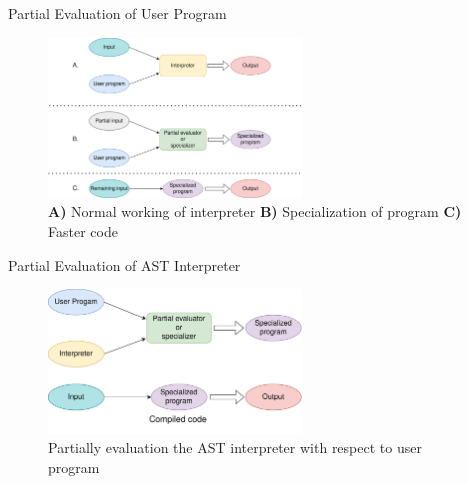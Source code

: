 \begin{frame}{Partial Evaluation of User Program}
    \begin{figure}[h]
        \centering
        \includegraphics[width=0.6\textwidth]{images/partial-eval-of-program}
        \caption{\textbf{A)} Normal working of interpreter \textbf{B)} Specialization of program \textbf{C)} Faster code}
    \end{figure}
\end{frame}
\begin{frame}{Partial Evaluation of AST Interpreter}
    \begin{figure}[h]
        \centering
        \includegraphics[width=0.6\textwidth]{images/partial-eval-of-interpreter.png}
        \caption{Partially evaluation the AST interpreter with respect to user program}
    \end{figure}
\end{frame}
